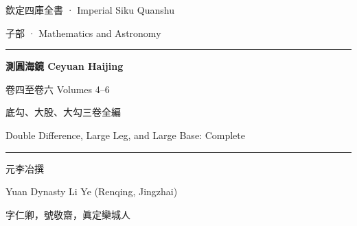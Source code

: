 \documentclass[9pt,a4paper]{article}
\begin{document}
\begin{titlepage}
\begin{center}
\vspace*{1.5cm}

{\fontsize{12}{16}\selectfont 欽定四庫全書 · Imperial Siku Quanshu}

\vspace{0.8cm}

{\fontsize{11}{14}\selectfont 子部 · Mathematics and Astronomy}

\vspace{1.5cm}

\rule{0.85\textwidth}{1.5pt}

\vspace{0.8cm}

{\fontsize{22}{28}\selectfont\bfseries\color{titlecolor} 測圓海鏡 \quad Ceyuan Haijing}

\vspace{0.4cm}

{\fontsize{14}{18}\selectfont 卷四至卷六 \quad Volumes 4--6}

\vspace{0.3cm}

{\fontsize{11}{14}\selectfont\color{notecolor} 底勾、大股、大勾三卷全編}

\vspace{0.2cm}

{\fontsize{10}{13}\selectfont\color{notecolor} Double Difference, Large Leg, and Large Base: Complete}

\vspace{0.8cm}

\rule{0.85\textwidth}{1.5pt}

\vspace{1.5cm}

{\fontsize{12}{16}\selectfont 元\quad 李冶\quad 撰}

\vspace{0.2cm}

{\fontsize{10}{13}\selectfont\color{notecolor} Yuan Dynasty \quad Li Ye (Renqing, Jingzhai)}

\vspace{0.5cm}

{\fontsize{10}{13}\selectfont\color{notecolor} 字仁卿，號敬齋，眞定欒城人}

\vspace{0.2cm}


\end{center}
\end{titlepage}
\end{document}
